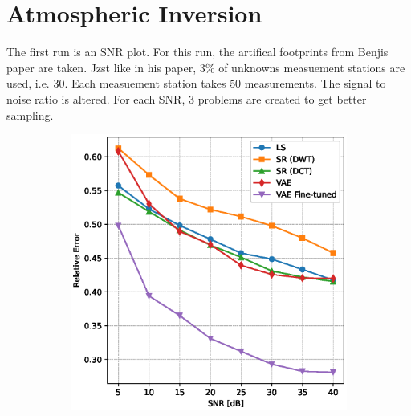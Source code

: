 \section{Atmospheric Inversion}
The first run is an SNR plot.
For this run, the artifical footprints from Benjis paper are taken.
Jzst like in his paper, $3\%$ of unknowns measuement stations are used, i.e. 30.
Each measuement station takes $50$ measurements.
The signal to noise ratio is altered.
For each SNR, 3 problems are created to get better sampling.
\begin{figure}
    \centering
    \begin{subfigure}[b]{0.49\textwidth}
        \includegraphics[width=\textwidth]{figures/06_results/snr_plots/munich_relative_error.eps}
    \end{subfigure}
    \begin{subfigure}[b]{0.49\textwidth}

\end{subfigure}
\end{figure}
